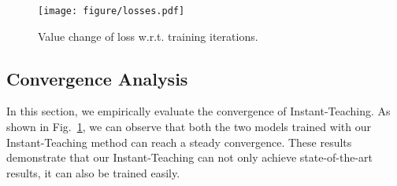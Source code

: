 \documentclass[final]{cvpr}
\begin{document}
\begin{table}[h]
\begin{center}
\end{center}
\caption{Descriptions of the hyperparameters used in our experiments.}
\label{tbl:hyper}
\end{table}



\begin{figure}[t!]
	\begin{center}
	\texttt{[image: figure/losses.pdf]}
	\end{center}
	\vspace{-.1in}
	\caption{Value change of loss w.r.t. training iterations.}
	\label{fig:convergence}
\end{figure}

\subsection{Convergence Analysis}
In this section, we empirically evaluate the convergence of Instant-Teaching. As shown in Fig.~\ref{fig:convergence}, we can observe that both the two models trained with our Instant-Teaching method can reach a steady convergence. These results demonstrate that our Instant-Teaching can not only achieve state-of-the-art results, it can also be trained easily.
\end{document}
